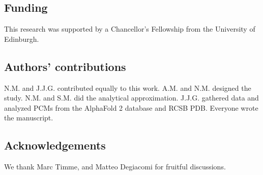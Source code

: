 \documentclass[
reprint,
twocolumn,
amsmath,amssymb,superscriptaddress,aps,
pre]{revtex4-1}
\begin{document}
\subsection{Funding}
This research was supported by a Chancellor's Fellowship from the University of Edinburgh. 
\subsection{Authors' contributions}
N.M. and J.J.G. contributed equally to this work. A.M. and N.M. designed the study. N.M. and S.M. did the analytical approximation. J.J.G. gathered data and analyzed PCMs from the AlphaFold 2 database and RCSB PDB. Everyone wrote the manuscript. 
\subsection{Acknowledgements}
We thank Marc Timme, and Matteo Degiacomi for fruitful discussions.



\end{document}
